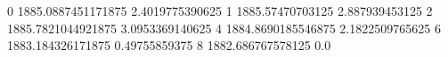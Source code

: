 0 1885.0887451171875 2.4019775390625
1 1885.57470703125 2.887939453125
2 1885.7821044921875 3.0953369140625
4 1884.8690185546875 2.1822509765625
6 1883.184326171875 0.49755859375
8 1882.686767578125 0.0
